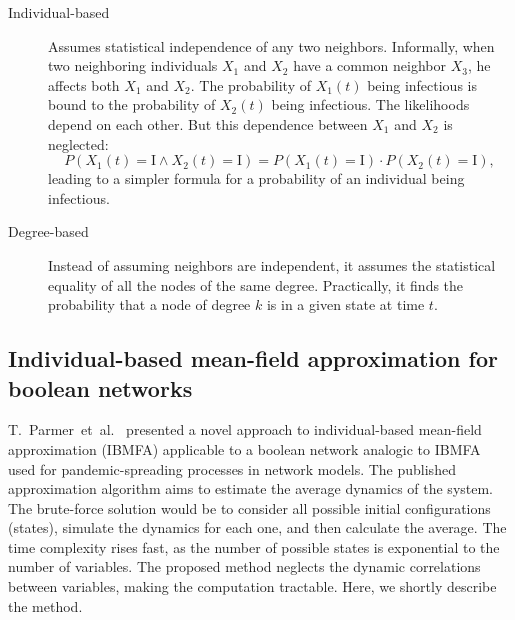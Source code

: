\documentclass[
	digital, oneside, nosansbold, nocolorbold, nolot, nolof
]{fithesis4}
\theoremstyle{definition}
\theoremstyle{definition}
\begin{document}
\begin{description}
    \item[Individual-based] Assumes statistical independence of any two
        neighbors. Informally, when two neighboring individuals $X_1$ and $X_2$
        have a common neighbor $X_3$, he affects both $X_1$ and $X_2$. The
        probability of $X_1(t)$ being infectious is bound to the probability of
        $X_2(t)$ being infectious. The likelihoods depend on each other. But
        this dependence between $X_1$ and $X_2$ is neglected:
        \[
            P(X_1(t) = \text{I} \land X_2(t) = \text{I}) =
            P(X_1(t) = \text{I}) \cdot P(X_2(t) = \text{I}),
        \]
        leading to a simpler formula for a probability of an individual being
        infectious.
    \item[Degree-based] Instead of assuming neighbors are independent, it
        assumes the statistical equality of all the nodes of the same degree.
        Practically, it finds the probability that a node of degree $k$ is in
        a given state at time $t$.
\end{description}

\subsection{Individual-based mean-field approximation for boolean networks}

T.~Parmer~et~al.~\cite{infl_max_BN} presented a novel approach to
individual-based mean-field approximation (IBMFA) applicable to a boolean
network analogic to IBMFA used for pandemic-spreading processes in network
models. The published approximation algorithm aims to estimate the average
dynamics of the system. The brute-force solution would be to consider all
possible initial configurations (states), simulate the dynamics for each one,
and then calculate the average. The time complexity rises fast, as the number
of possible states is exponential to the number of variables.  The proposed
method neglects the dynamic correlations between variables, making the
computation tractable. Here, we shortly describe the method.
\end{document}
